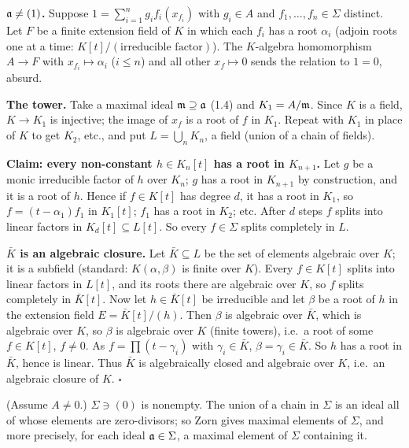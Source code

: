 \documentclass[11pt]{article}
\begin{document}
\textbf{$\mathfrak a\ne(1)$.} Suppose $1=\sum_{i=1}^ng_if_i(x_{f_i})$ with $g_i\in A$ and $f_1,\dots,f_n\in\Sigma$ distinct. Let $F$ be a finite extension field of $K$ in which each $f_i$ has a root $\alpha_i$ (adjoin roots one at a time: $K[t]/(\text{irreducible factor})$). The $K$-algebra homomorphism $A\to F$ with $x_{f_i}\mapsto\alpha_i$ ($i\le n$) and all other $x_f\mapsto0$ sends the relation to $1=0$, absurd.

\textbf{The tower.} Take a maximal ideal $\mathfrak m\supseteq\mathfrak a$ (1.4) and $K_1=A/\mathfrak m$. Since $K$ is a field, $K\to K_1$ is injective; the image of $x_f$ is a root of $f$ in $K_1$. Repeat with $K_1$ in place of $K$ to get $K_2$, etc., and put $L=\bigcup_nK_n$, a field (union of a chain of fields).

\textbf{Claim: every non-constant $h\in K_n[t]$ has a root in $K_{n+1}$.} Let $g$ be a monic irreducible factor of $h$ over $K_n$; $g$ has a root in $K_{n+1}$ by construction, and it is a root of $h$.
Hence if $f\in K[t]$ has degree $d$, it has a root in $K_1$, so $f=(t-\alpha_1)f_1$ in $K_1[t]$; $f_1$ has a root in $K_2$; etc. After $d$ steps $f$ splits into linear factors in $K_d[t]\subseteq L[t]$. So every $f\in\Sigma$ splits completely in $L$.

\textbf{$\bar K$ is an algebraic closure.} Let $\bar K\subseteq L$ be the set of elements algebraic over $K$; it is a subfield (standard: $K(\alpha,\beta)$ is finite over $K$). Every $f\in K[t]$ splits into linear factors in $L[t]$, and its roots there are algebraic over $K$, so $f$ splits completely in $\bar K[t]$. Now let $h\in\bar K[t]$ be irreducible and let $\beta$ be a root of $h$ in the extension field $E=\bar K[t]/(h)$. Then $\beta$ is algebraic over $\bar K$, which is algebraic over $K$, so $\beta$ is algebraic over $K$ (finite towers), i.e.\ a root of some $f\in K[t]$, $f\ne0$. As $f=\prod(t-\gamma_i)$ with $\gamma_i\in\bar K$, $\beta=\gamma_i\in\bar K$. So $h$ has a root in $\bar K$, hence is linear. Thus $\bar K$ is algebraically closed and algebraic over $K$, i.e.\ an algebraic closure of $K$. \hfill$\square$

\pf
(Assume $A\ne0$.) $\Sigma\ni(0)$ is nonempty. The union of a chain in $\Sigma$ is an ideal all of whose elements are zero-divisors; so Zorn gives maximal elements of $\Sigma$, and more precisely, for each ideal $\mathfrak a\in\Sigma$, a maximal element of $\Sigma$ containing it.
\end{document}
